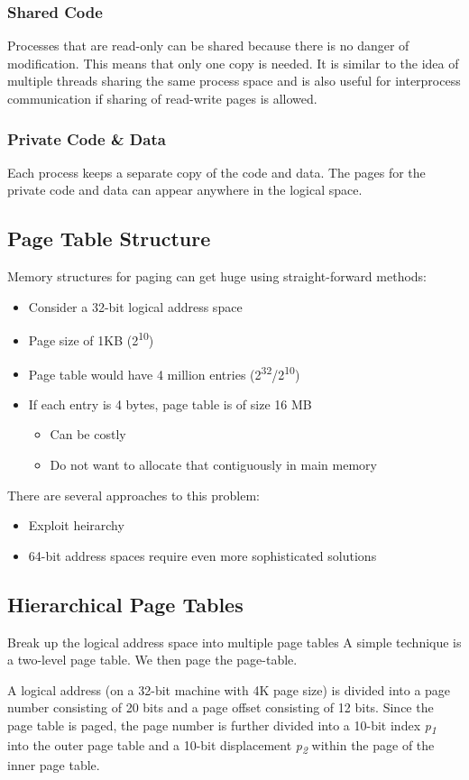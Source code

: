 \documentclass[11pt]{article}
\begin{document}
\subsubsection{Shared Code}
\label{sec:org950e62b}
Processes that are read-only can be shared because there is no danger of modification.
This means that only one copy is needed.
It is similar to the idea of multiple threads sharing the same process space and is also useful for interprocess communication if sharing of read-write pages is allowed.
\subsubsection{Private Code \& Data}
\label{sec:org88ca9e7}
Each process keeps a separate copy of the code and data.
The pages for the private code and data can appear anywhere in the logical space.
\subsection{Page Table Structure}
\label{sec:orgc7af461}
Memory structures for paging can get huge using straight-forward methods:
\begin{itemize}
\item Consider a 32-bit logical address space
\item Page size of 1KB (2\textsuperscript{10})
\item Page table would have 4 million entries (2\textsuperscript{32}/2\textsuperscript{10})
\item If each entry is 4 bytes, page table is of size 16 MB
\begin{itemize}
\item Can be costly
\item Do not want to allocate that contiguously in main memory
\end{itemize}
\end{itemize}
There are several approaches to this problem:
\begin{itemize}
\item Exploit heirarchy
\item 64-bit address spaces require even more sophisticated solutions
\end{itemize}
\subsection{Hierarchical Page Tables}
\label{sec:orgfed115b}
Break up the logical address space into multiple page tables
A simple technique is a two-level page table.
We then page the page-table.

A logical address (on a 32-bit machine with 4K page size) is divided into a page number consisting of 20 bits and a page offset consisting of 12 bits.
Since the page table is paged, the page number is further divided into a 10-bit index \emph{p\textsubscript{1}} into the outer page table and a 10-bit displacement \emph{p\textsubscript{2}} within the page of the inner page table.
\end{document}
